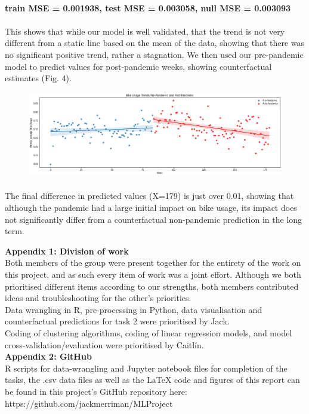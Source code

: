 \documentclass[11pt,letterpaper]{article}
\begin{document}
\paragraph{}
	\textbf{train MSE = 0.001938, test MSE = 0.003058, null MSE = 0.003093}
\paragraph{}
	This shows that while our model is well validated, that the trend is not very different from a static line based on the mean of the data, showing that there was no significant positive trend, rather a stagnation. We then used our pre-pandemic model to predict values for post-pandemic weeks, showing counterfactual estimates (Fig. 4).
\begin{figure}[h]
	\centering
	\includegraphics[width=\textwidth]{comparison.png}
\end{figure}
\paragraph{}
	The final difference in predicted values (X=179) is just over 0.01, showing that although the pandemic had a large initial impact on bike usage, its impact does not significantly differ from a counterfactual non-pandemic prediction in the long term.
\newpage




\noindent \textbf{Appendix 1: Division of work}\\

Both members of the group were present together for the entirety of the work on this project, and as such every item of work was a joint effort. Although we both prioritised different items according to our strengths, both members contributed ideas and troubleshooting for the other’s priorities. \\

Data wrangling in R, pre-processing in Python, data visualisation and counterfactual predictions for task 2 were prioritised by Jack.\\

Coding of clustering algorithms, coding of linear regression models, and model cross-validation/evaluation were prioritised by Caitlín.\\

\noindent \textbf{Appendix 2: GitHub}\\

R scripts for data-wrangling and Jupyter notebook files for completion of the tasks, the .csv data files as well as the \LaTeX\hspace{0.05cm} code and figures of this report can be found in this project’s GitHub repository here: https://github.com/jackmerriman/MLProject
\end{document}
